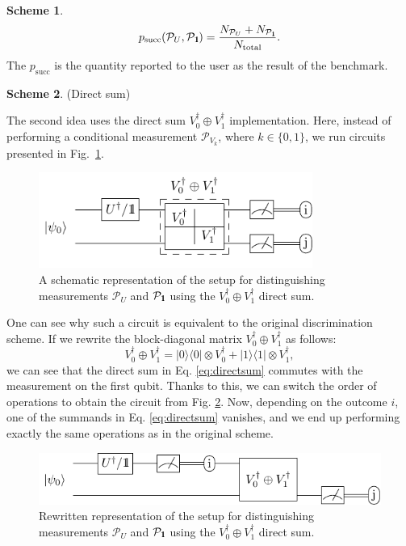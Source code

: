 \documentclass[preprint,12pt, a4paper, dvipsnames]{elsarticle}
\newcommand{\ket}[1]{\ensuremath{|#1\rangle}}
\newcommand{\bra}[1]{\ensuremath{\langle#1|}}
\newcommand{\ketbra}[2]{\ensuremath{\ket{#1}\bra{#2}}}
\newcommand{\proj}[1]{\ensuremath{\ketbra{#1}{#1}}}
\newcommand{\1}{{\rm 1\hspace{-0.9mm}l}}
\newcommand{\Id}{{\rm 1\hspace{-0.9mm}l}}
\newcommand{\PP}{\mathcal{P}}
\theoremstyle{definition}
\newtheorem{scheme}{Scheme}
\begin{document}
\begin{scheme}
	\begin{equation}
	p_{\text{succ}}(\PP_{U}, \PP_{\Id}) = \frac{N_{\PP_U} + N_{\PP_\Id}}{N_{\text{total}}}.
	\end{equation}
	The $p_{\text{succ}}$ is the quantity reported to the user as the result of the benchmark.
\end{scheme}

\begin{scheme}(Direct sum)

The second idea uses the direct sum $V_0^\dagger \oplus V_1^\dagger$ implementation. Here, instead
of performing a conditional measurement $\PP_{V_k}$, where $k\in \{0,1\}$,  we run circuits
presented in Fig.~\ref{fig:controlled}.
	\begin{figure}[h!]
		\centering
		\includegraphics[width=0.8\textwidth]{pics/controlled_unitary}

		\caption{ A schematic representation of the setup for distinguishing
			measurements $\PP_{U}$ and $\PP_{\Id}$ using the $V_0^\dagger \oplus V_1^\dagger$ direct sum.
		}\label{fig:controlled}
	\end{figure}

	One can see why such a circuit is equivalent to the original discrimination scheme.
	If we rewrite the block-diagonal matrix $V_0^\dagger \oplus V_1^\dagger$ as follows:
	\begin{equation}
		\label{eq:directsum}
		V_0^\dagger \oplus V_1^\dagger = \proj{0}\otimes V_0^\dagger + \proj{1} \otimes V_1^\dagger,
	\end{equation}
	we can see that the direct sum in Eq. \eqref{eq:directsum} commutes with the measurement on the
	first qubit. Thanks to this, we can switch the order of operations to obtain the circuit from
	Fig. \ref{fig:directsum}. Now, depending on the outcome $i$, one of the summands in
	Eq. \eqref{eq:directsum} vanishes, and we end up performing exactly the same operations as in
	the original scheme.

	\begin{figure}[h!]
		\centering
		\includegraphics[width=\textwidth]{pics/direct_sum}
		\caption{Rewritten representation of the setup for distinguishing
		measurements $\PP_{U}$ and $\PP_{\Id}$ using the $V_0^\dagger \oplus V_1^\dagger$ direct
		sum.
		}\label{fig:directsum}
	\end{figure}


\end{scheme}
\end{document}
